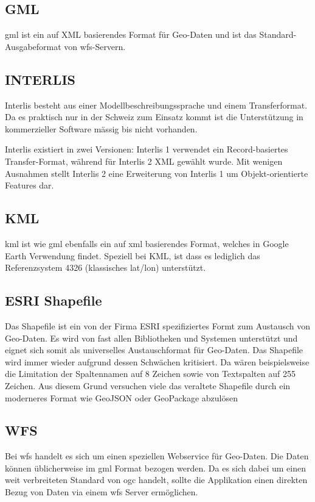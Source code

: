 \subsection{GML}
\gls{gml} ist ein auf XML basierendes Format für Geo-Daten und ist das Standard-Ausgabeformat von \acs{wfs}-Servern.


\subsection{INTERLIS}
Interlis besteht aus einer Modellbeschreibungssprache und einem Transferformat. Da es praktisch nur in der Schweiz zum Einsatz kommt ist die Unterstützung in kommerzieller Software mässig bis nicht vorhanden.

Interlis existiert in zwei Versionen: Interlis 1 verwendet ein Record-basiertes Transfer-Format, während für Interlis 2 XML gewählt wurde. Mit wenigen Ausnahmen stellt Interlis 2 eine Erweiterung von Interlis 1 um Objekt-orientierte Features dar.

\subsection{KML}
\gls{kml} ist wie \gls{gml} ebenfalls ein auf \gls{xml} basierendes Format, welches in Google Earth Verwendung findet. Speziell bei KML, ist dass es lediglich das Referenzsystem 4326 (klassisches lat/lon) unterstützt.


\subsection{ESRI Shapefile}
Das Shapefile ist ein von der Firma ESRI spezifiziertes Formt zum Austausch von Geo-Daten. Es wird von fast allen Bibliotheken und Systemen unterstützt und eignet sich somit als universelles Austauschformat für Geo-Daten. Das Shapefile wird immer wieder aufgrund dessen Schwächen kritisiert. Da wären beispielsweise die Limitation der Spaltennamen auf 8 Zeichen sowie von Textspalten auf 255 Zeichen. Aus diesem Grund versuchen viele das veraltete Shapefile durch ein moderneres Format wie GeoJSON oder GeoPackage abzulösen\cite{sfkeller}

\subsection{WFS}
Bei \gls{wfs} handelt es sich um einen speziellen Webservice für Geo-Daten. Die Daten können üblicherweise im \gls{gml} Format bezogen werden. Da es sich dabei um einen weit verbreiteten Standard von \gls{ogc} handelt, sollte die Applikation einen direkten Bezug von Daten via einem \acs{wfs} Server ermöglichen.

